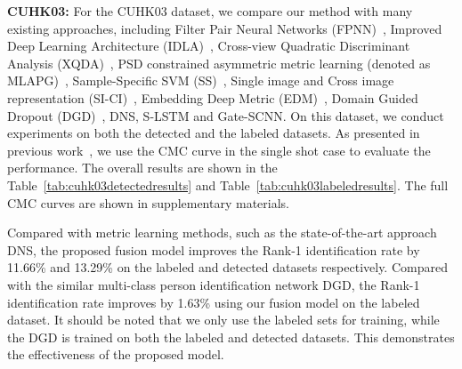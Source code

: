 \documentclass[10pt,twocolumn,letterpaper]{article}
\begin{document}
\textbf{CUHK03:} For the CUHK03 dataset, we compare our method with many existing approaches, including Filter Pair Neural Networks (FPNN)~\cite{LiWeiCVPR14}, Improved Deep Learning Architecture (IDLA)~\cite{AhmedCVPR15improved}, Cross-view Quadratic Discriminant Analysis (XQDA)~\cite{LiaoshengcaiCVPR15}, PSD constrained asymmetric metric learning (denoted as MLAPG)~\cite{LiaoshengcaiICCV15},
Sample-Specific SVM (SS)~\cite{ZhangCVPR16sample}, Single image and Cross image representation (SI-CI)~\cite{WangfaqiangCVPR16JSC},
Embedding Deep Metric (EDM)~\cite{Shihanlin2016Embedding}, Domain Guided Dropout (DGD)~\cite{XiaotongCVPR16Domain}, DNS, S-LSTM and Gate-SCNN.
On this dataset, we conduct experiments on both the detected and the labeled datasets.
As presented in previous work~\cite{LiWeiCVPR14}, we use the CMC curve in the single shot case to evaluate the performance.
The overall results are shown in the Table~\ref{tab:cuhk03detectedresults} and Table~\ref{tab:cuhk03labeledresults}.
The full CMC curves are shown in supplementary materials.

Compared with metric learning methods, such as the state-of-the-art approach DNS, the proposed fusion model improves the Rank-1 identification rate by 11.66\% and 13.29\% on the labeled and detected datasets respectively.
Compared with the similar multi-class person identification network DGD, the Rank-1 identification rate improves by 1.63\%
using our fusion model on the labeled dataset.
It should be noted that we only use the labeled sets for training, while the DGD is trained on both the labeled and detected datasets.
This demonstrates the effectiveness of the proposed model.
\end{document}
